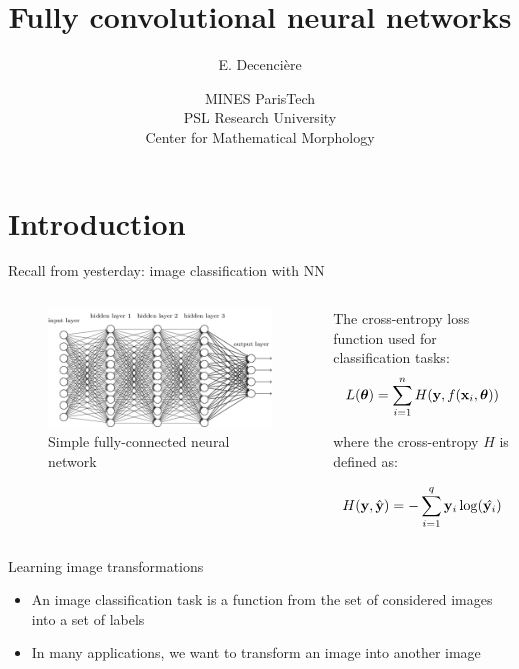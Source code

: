 \documentclass[xcolor=pdftex,dvipsnames,table,mathserif]{beamer}
\title{Fully convolutional neural networks}
\author{E. Decencière}
\date{MINES ParisTech\\
  PSL Research University\\
  Center for Mathematical Morphology
}
\begin{document}
\frame{\titlepage}


\section{Introduction}


\begin{frame}{Recall from yesterday: image classification with NN}

\begin{columns}

  \begin{column}{.5\textwidth}
    \begin{figure}[ht]
      \centering
      \includegraphics[width=\textwidth]{network.png}\\
       Simple fully-connected neural network
    \end{figure}
  \end{column}

  \begin{column}{.5\textwidth}
    The cross-entropy loss function used for classification tasks:
    \[
        L(\boldsymbol{\theta}) = \sum\limits_{i=1}^n H(\mathbf{y}, f(\mathbf{x}_i, \boldsymbol{\theta}))
        \]

        where the cross-entropy $H$ is defined as:

        \[
        H(\mathbf{y}, \hat{\mathbf{y}}) = -\sum\limits_{i=1}^q \mathbf{y}_i \log( \hat{\mathbf{y}_i})
        \]
  \end{column}
\end{columns}

\end{frame}


\begin{frame}{Learning image transformations}

  \begin{itemize}
  \item An image classification task is a function from the set of considered images into a set of labels
  \item In many applications, we want to transform an image into another image
  \end{itemize}

\end{frame}
\end{document}
